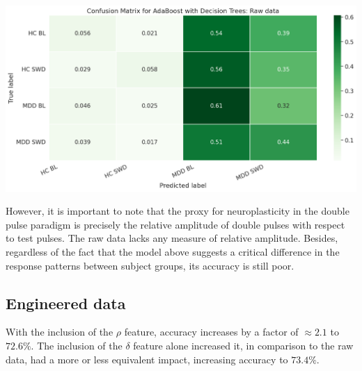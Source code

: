\documentclass{article}
\begin{document}
\centering
~

\includegraphics[scale=0.4]{cm-raw}


\justifying
\begin{multicols}{2}

However, it is important to note that the proxy for neuroplasticity in the
double pulse paradigm is precisely the relative amplitude of double pulses with
respect to test pulses. The raw data lacks any measure of relative amplitude.
Besides, regardless of the fact that the model above suggests a critical
difference in the response patterns between subject groups, its accuracy is
still poor.

\subsection{Engineered data}

With the inclusion of the $\rho$ feature, accuracy increases by a factor of
$\approx 2.1$ to $72.6\%$. The inclusion of the $\delta$ feature alone increased
it, in comparison to the raw data, had a more or less equivalent impact,
increasing accuracy to $73.4\%$.


\end{multicols}
\raggedright

~
\end{document}
